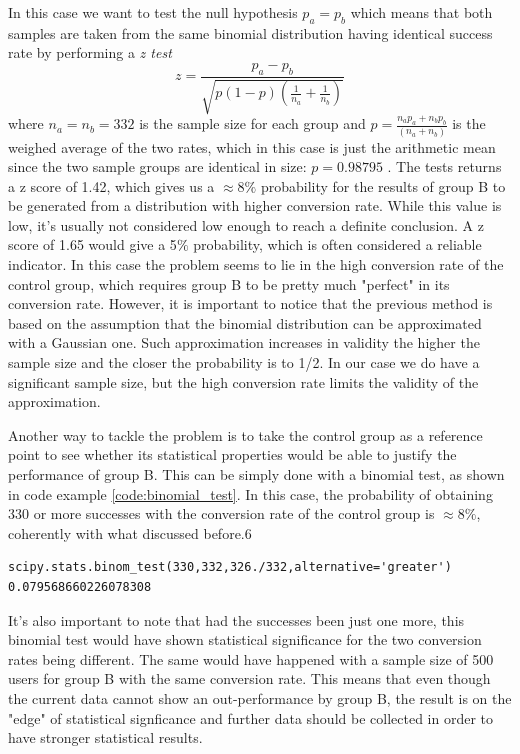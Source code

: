 \documentclass[paper=a4, fontsize=10pt]{report}
\begin{document}
In this case we want to test the null hypothesis $p_{a} = p_{b}$ which means that both samples are taken from the same binomial distribution having identical
 success rate by performing a \textit{z test}
\begin{equation}
 z = \frac{p_{a}-p_{b}}{\sqrt{p(1-p)(\frac{1}{n_{a}} + \frac{1}{n_{b}})}}
\end{equation}
where $n_{a} = n_{b} = 332 $ is the sample size for each group and $ p = \frac{n_{a}p_{a} + n_{b}p_{b}}{ (n_{a} + n_{b})}$ is the weighed average of the two rates,
which in this case is just the arithmetic mean since the two sample groups are identical in size: $p = 0.98795$
. The tests returns a z score of 1.42, which gives us a $\approx 8\%$ probability for the results of group B to be generated from a distribution with higher
conversion rate.
While this value is low, it's usually not considered low enough to reach a definite conclusion. A z score of 1.65 would give a 5$\%$ probability,
which is often considered a reliable indicator. In this case the problem seems to lie in the high conversion rate of the control group,
which requires group B to be pretty much "perfect" in its conversion rate.
However, it is important to notice that the previous method is based on the assumption that the binomial distribution can be approximated with a Gaussian one.
Such approximation increases in validity the higher the sample size and the closer the probability is to 1/2. In our case we do have a significant sample size, but the 
high conversion rate limits the validity of the approximation.

Another way to tackle the problem is to take the control group as a reference point to see whether its statistical properties would be
able to justify the performance of group B. This can be simply done with a binomial test, as shown in code example \ref{code:binomial_test}. In this case, 
the probability
of obtaining 330 or more successes with the conversion rate of the control group is $\approx 8\%$, coherently with what discussed before.6

\footnotesize
\begin{lstlisting}[frame=single,caption= Binomial Test\label{code:binomial_test}]
scipy.stats.binom_test(330,332,326./332,alternative='greater')
0.079568660226078308
\end{lstlisting}
\normalsize

It's also important to note that had the successes been just one more, this binomial test would have shown statistical significance
for the two conversion rates being different. The same would have happened with a sample size of 500 users for group B with the 
same conversion rate.
This means that even though the current data cannot show an out-performance by 
group B, the result is on the "edge" of statistical signficance and further data should be collected in order to have stronger
statistical results.
\end{document}
